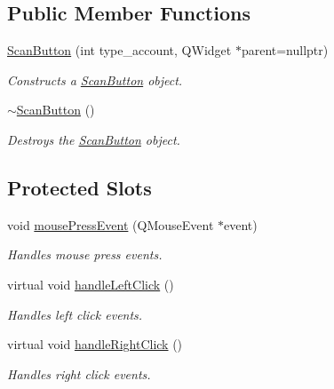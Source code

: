 \subsection*{Public Member Functions}
\begin{DoxyCompactItemize}
\item 
\hyperlink{classScanButton_a85de89a14f571d120f1d602c5642c28d}{Scan\+Button} (int type\+\_\+account, Q\+Widget $\ast$parent=nullptr)
\begin{DoxyCompactList}\small\item\em Constructs a \hyperlink{classScanButton}{Scan\+Button} object. \end{DoxyCompactList}\item 
\hyperlink{classScanButton_a080940ebdacd95fa1c2b03895da87e57}{$\sim$\+Scan\+Button} ()
\begin{DoxyCompactList}\small\item\em Destroys the \hyperlink{classScanButton}{Scan\+Button} object. \end{DoxyCompactList}\end{DoxyCompactItemize}
\subsection*{Protected Slots}
\begin{DoxyCompactItemize}
\item 
void \hyperlink{classScanButton_ad2d0bac19d1ec704cbdf2bc07b0b8641}{mouse\+Press\+Event} (Q\+Mouse\+Event $\ast$event)
\begin{DoxyCompactList}\small\item\em Handles mouse press events. \end{DoxyCompactList}\item 
virtual void \hyperlink{classScanButton_a41e30224cc4068cb4cb23341561c41fa}{handle\+Left\+Click} ()
\begin{DoxyCompactList}\small\item\em Handles left click events. \end{DoxyCompactList}\item 
virtual void \hyperlink{classScanButton_a1ee18ddda87535b007a2eca7899d0879}{handle\+Right\+Click} ()
\begin{DoxyCompactList}\small\item\em Handles right click events. \end{DoxyCompactList}\end{DoxyCompactItemize}
